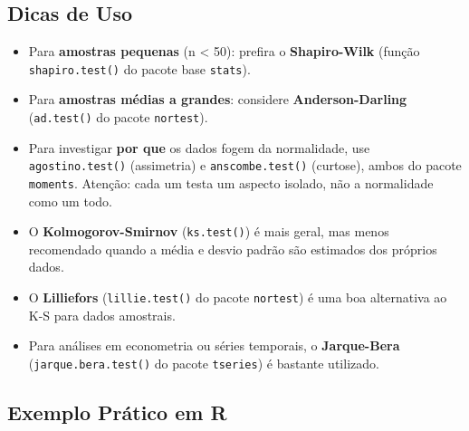 \documentclass[
]{book}
\newenvironment{Shaded}{\begin{snugshade}}{\end{snugshade}}
\newcommand{\CommentTok}[1]{\textcolor[rgb]{0.56,0.35,0.01}{\textit{#1}}}
\newcommand{\FunctionTok}[1]{\textcolor[rgb]{0.13,0.29,0.53}{\textbf{#1}}}
\newcommand{\NormalTok}[1]{#1}
\newcommand{\OtherTok}[1]{\textcolor[rgb]{0.56,0.35,0.01}{#1}}
\newcommand{\SpecialCharTok}[1]{\textcolor[rgb]{0.81,0.36,0.00}{\textbf{#1}}}
\newcommand{\StringTok}[1]{\textcolor[rgb]{0.31,0.60,0.02}{#1}}
\providecommand{\tightlist}{%
  \setlength{\itemsep}{0pt}\setlength{\parskip}{0pt}}
\begin{document}
\subsection{Dicas de Uso}\label{dicas-de-uso}

\begin{itemize}
\tightlist
\item
  Para \textbf{amostras pequenas} (n \textless{} 50): prefira o \textbf{Shapiro-Wilk} (função \texttt{shapiro.test()} do pacote base \texttt{stats}).
\item
  Para \textbf{amostras médias a grandes}: considere \textbf{Anderson-Darling} (\texttt{ad.test()} do pacote \texttt{nortest}).
\item
  Para investigar \textbf{por que} os dados fogem da normalidade, use \texttt{agostino.test()} (assimetria) e \texttt{anscombe.test()} (curtose), ambos do pacote \texttt{moments}. Atenção: cada um testa um aspecto isolado, não a normalidade como um todo.
\item
  O \textbf{Kolmogorov-Smirnov} (\texttt{ks.test()}) é mais geral, mas menos recomendado quando a média e desvio padrão são estimados dos próprios dados.
\item
  O \textbf{Lilliefors} (\texttt{lillie.test()} do pacote \texttt{nortest}) é uma boa alternativa ao K-S para dados amostrais.
\item
  Para análises em econometria ou séries temporais, o \textbf{Jarque-Bera} (\texttt{jarque.bera.test()} do pacote \texttt{tseries}) é bastante utilizado.
\end{itemize}

\subsection{Exemplo Prático em R}\label{exemplo-pruxe1tico-em-r-2}

\begin{Shaded}
\end{Shaded}
\end{document}
